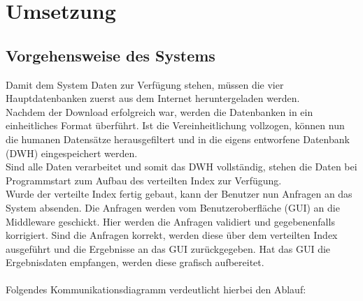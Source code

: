 \newpage
\section{Umsetzung}
\subsection{Vorgehensweise des Systems}
Damit dem System Daten zur Verfügung stehen, müssen die vier Hauptdatenbanken zuerst aus dem Internet heruntergeladen werden.\\
Nachdem der Download erfolgreich war, werden die Datenbanken in ein einheitliches Format überführt. Ist die Vereinheitlichung vollzogen, können nun die humanen Datensätze herausgefiltert und in die eigens entworfene Datenbank (DWH) eingespeichert werden.
\\
Sind alle Daten verarbeitet und somit das DWH vollständig, stehen die Daten bei Programmstart zum Aufbau des verteilten Index zur Verfügung. \\
Wurde der verteilte Index fertig gebaut, kann der Benutzer nun Anfragen an das System absenden. Die Anfragen werden vom Benutzeroberfläche (GUI) an die Middleware geschickt. Hier werden die Anfragen validiert und gegebenenfalls korrigiert. Sind die Anfragen korrekt, werden diese über dem verteilten Index ausgeführt und die Ergebnisse an das GUI zurückgegeben. Hat das GUI die Ergebnisdaten empfangen, werden diese grafisch aufbereitet.\\\\
Folgendes Kommunikationsdiagramm verdeutlicht hierbei den Ablauf:\\\\
\begin{center}
\end{center}
\newpage

